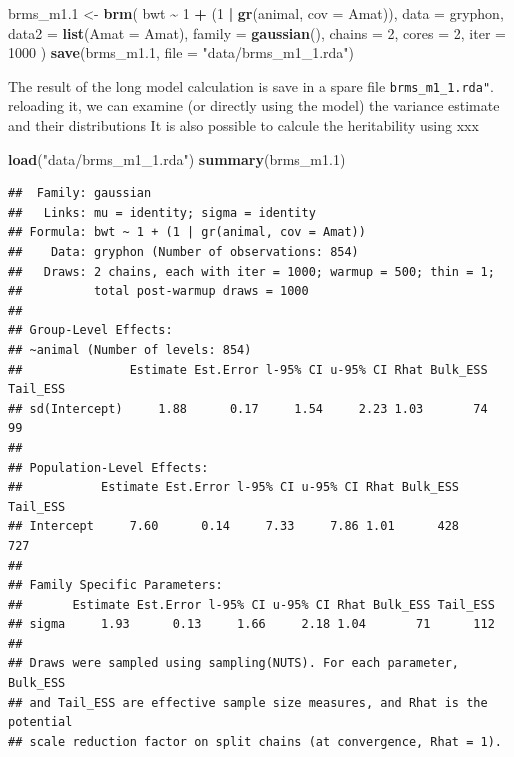 \documentclass[
  12pt,
]{book}
\newenvironment{Shaded}{\begin{snugshade}}{\end{snugshade}}
\newcommand{\DataTypeTok}[1]{\textcolor[rgb]{0.13,0.29,0.53}{#1}}
\newcommand{\DecValTok}[1]{\textcolor[rgb]{0.00,0.00,0.81}{#1}}
\newcommand{\FloatTok}[1]{\textcolor[rgb]{0.00,0.00,0.81}{#1}}
\newcommand{\KeywordTok}[1]{\textcolor[rgb]{0.13,0.29,0.53}{\textbf{#1}}}
\newcommand{\NormalTok}[1]{#1}
\newcommand{\OperatorTok}[1]{\textcolor[rgb]{0.81,0.36,0.00}{\textbf{#1}}}
\newcommand{\StringTok}[1]{\textcolor[rgb]{0.31,0.60,0.02}{#1}}
\begin{document}
\begin{Shaded}
\begin{Highlighting}[]
\NormalTok{brms\_m1}\FloatTok{.1}\NormalTok{ \textless{}{-}}\StringTok{ }\KeywordTok{brm}\NormalTok{(}
\NormalTok{  bwt }\OperatorTok{\textasciitilde{}}\StringTok{ }\DecValTok{1} \OperatorTok{+}\StringTok{ }\NormalTok{(}\DecValTok{1} \OperatorTok{|}\StringTok{ }\KeywordTok{gr}\NormalTok{(animal, }\DataTypeTok{cov =}\NormalTok{ Amat)),}
  \DataTypeTok{data =}\NormalTok{ gryphon,}
  \DataTypeTok{data2 =} \KeywordTok{list}\NormalTok{(}\DataTypeTok{Amat =}\NormalTok{ Amat),}
  \DataTypeTok{family =} \KeywordTok{gaussian}\NormalTok{(),}
  \DataTypeTok{chains =} \DecValTok{2}\NormalTok{, }\DataTypeTok{cores =} \DecValTok{2}\NormalTok{, }\DataTypeTok{iter =} \DecValTok{1000}
\NormalTok{)}
\KeywordTok{save}\NormalTok{(brms\_m1}\FloatTok{.1}\NormalTok{, }\DataTypeTok{file =} \StringTok{"data/brms\_m1\_1.rda"}\NormalTok{)}
\end{Highlighting}
\end{Shaded}

The result of the long model calculation is save in a spare file \texttt{brms\_m1\_1.rda"}.
reloading it, we can examine (or directly using the model) the variance estimate and their distributions
It is also possible to calcule the heritability using xxx

\begin{Shaded}
\begin{Highlighting}[]
\KeywordTok{load}\NormalTok{(}\StringTok{"data/brms\_m1\_1.rda"}\NormalTok{)}
\KeywordTok{summary}\NormalTok{(brms\_m1}\FloatTok{.1}\NormalTok{)}
\end{Highlighting}
\end{Shaded}

\begin{verbatim}
##  Family: gaussian 
##   Links: mu = identity; sigma = identity 
## Formula: bwt ~ 1 + (1 | gr(animal, cov = Amat)) 
##    Data: gryphon (Number of observations: 854) 
##   Draws: 2 chains, each with iter = 1000; warmup = 500; thin = 1;
##          total post-warmup draws = 1000
## 
## Group-Level Effects: 
## ~animal (Number of levels: 854) 
##               Estimate Est.Error l-95% CI u-95% CI Rhat Bulk_ESS Tail_ESS
## sd(Intercept)     1.88      0.17     1.54     2.23 1.03       74       99
## 
## Population-Level Effects: 
##           Estimate Est.Error l-95% CI u-95% CI Rhat Bulk_ESS Tail_ESS
## Intercept     7.60      0.14     7.33     7.86 1.01      428      727
## 
## Family Specific Parameters: 
##       Estimate Est.Error l-95% CI u-95% CI Rhat Bulk_ESS Tail_ESS
## sigma     1.93      0.13     1.66     2.18 1.04       71      112
## 
## Draws were sampled using sampling(NUTS). For each parameter, Bulk_ESS
## and Tail_ESS are effective sample size measures, and Rhat is the potential
## scale reduction factor on split chains (at convergence, Rhat = 1).
\end{verbatim}
\end{document}

